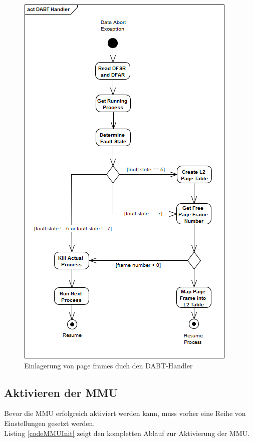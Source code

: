 \begin{figure}[H]
	\centering
	\includegraphics[scale=0.75]{chapters/mmu/figures/DABTHandler}
	\caption{Einlagerung von page frames duch den DABT-Handler}
	\label{fig:dabthandler}
\end{figure}


\subsection{Aktivieren der MMU}
\label{subsect:activateMMU}

Bevor die \ac{MMU} erfolgreich aktiviert werden kann, muss vorher eine Reihe von Einstellungen gesetzt werden.\\


Listing \ref{codeMMUInit} zeigt den kompletten Ablauf zur Aktivierung der \ac{MMU}.




